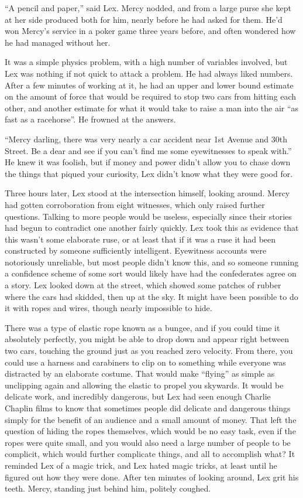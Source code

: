 \documentclass[ebook,12pt]{memoir}
\begin{document}
``A pencil and paper,'' said Lex. Mercy nodded, and from a large purse
she kept at her side produced both for him, nearly before he had asked
for them. He'd won Mercy's service in a poker game three years before,
and often wondered how he had managed without her.

It was a simple physics problem, with a high number of variables
involved, but Lex was nothing if not quick to attack a problem. He had
always liked numbers. After a few minutes of working at it, he had an
upper and lower bound estimate on the amount of force that would be
required to stop two cars from hitting each other, and another estimate
for what it would take to raise a man into the air ``as fast as a
racehorse''. He frowned at the answers.

``Mercy darling, there was very nearly a car accident near 1st Avenue
and 30th Street. Be a dear and see if you can't find me some
eyewitnesses to speak with.'' He knew it was foolish, but if money and
power didn't allow you to chase down the things that piqued your
curiosity, Lex didn't know what they were good for.

Three hours later, Lex stood at the intersection himself, looking
around. Mercy had gotten corroboration from eight witnesses, which only
raised further questions. Talking to more people would be useless,
especially since their stories had begun to contradict one another
fairly quickly. Lex took this as evidence that this wasn't some
elaborate ruse, or at least that if it was a ruse it had been
constructed by someone sufficiently intelligent. Eyewitness accounts
were notoriously unreliable, but most people didn't know this, and so
someone running a confidence scheme of some sort would likely have had
the confederates agree on a story. Lex looked down at the street, which
showed some patches of rubber where the cars had skidded, then up at the
sky. It might have been possible to do it with ropes and wires, though
nearly impossible to hide.

There was a type of elastic rope known as a bungee, and if you could
time it absolutely perfectly, you might be able to drop down and appear
right between two cars, touching the ground just as you reached zero
velocity. From there, you could use a harness and carabiners to clip on
to something while everyone was distracted by an elaborate costume. That
would make ``flying'' as simple as unclipping again and allowing the
elastic to propel you skywards. It would be delicate work, and
incredibly dangerous, but Lex had seen enough Charlie Chaplin films to
know that sometimes people did delicate and dangerous things simply for
the benefit of an audience and a small amount of money. That left the
question of hiding the ropes themselves, which would be no easy task,
even if the ropes were quite small, and you would also need a large
number of people to be complicit, which would further complicate things,
and all to accomplish what? It reminded Lex of a magic trick, and Lex
hated magic tricks, at least until he figured out how they were done.
After ten minutes of looking around, Lex grit his teeth. Mercy, standing
just behind him, politely coughed.
\end{document}
